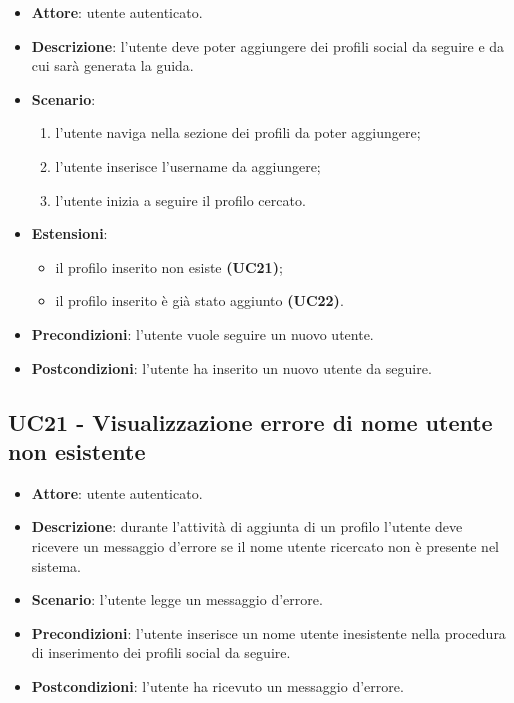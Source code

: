 \begin{itemize}
    \item \textbf{Attore}: utente autenticato.
    \item \textbf{Descrizione}: l'utente deve poter aggiungere dei profili social da seguire e da cui sarà generata la guida.
    \item \textbf{Scenario}:
    \begin{enumerate}
        \item l'utente naviga nella sezione dei profili da poter aggiungere;
        \item l'utente inserisce l'username da aggiungere;
        \item l'utente inizia a seguire il profilo cercato.
    \end{enumerate}
    \item \textbf{Estensioni}:
    \begin{itemize}
    	\item il profilo inserito non esiste \textbf{(UC21)};
    	\item il profilo inserito è già stato aggiunto \textbf{(UC22)}.
    \end{itemize} 
    \item \textbf{Precondizioni}: l'utente vuole seguire un nuovo utente.
    \item \textbf{Postcondizioni}: l'utente ha inserito un nuovo utente da seguire.
\end{itemize}

\newpage

\subsection{UC21 - Visualizzazione errore di nome utente non esistente}
\begin{itemize}
    \item \textbf{Attore}: utente autenticato.
    \item \textbf{Descrizione}: durante l'attività di aggiunta di un profilo l'utente deve ricevere un messaggio d'errore se il nome utente ricercato non è presente nel sistema.
    \item \textbf{Scenario}: l'utente legge un messaggio d'errore. 
    \item \textbf{Precondizioni}: l'utente inserisce un nome utente inesistente nella procedura di inserimento dei profili social da seguire.
    \item \textbf{Postcondizioni}: l'utente ha ricevuto un messaggio d'errore.
\end{itemize}

